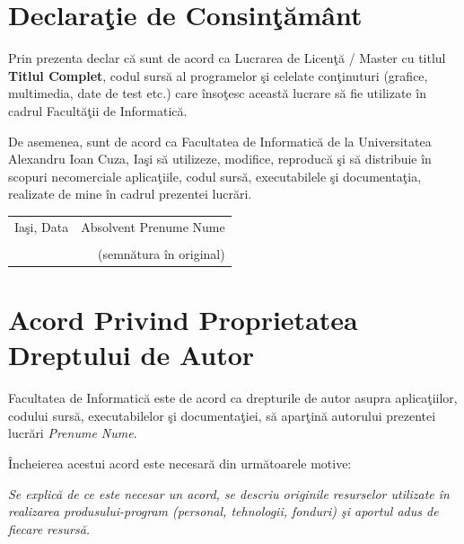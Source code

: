 \newpage
\thispagestyle{empty}

\section*{Declara\c tie de Consin\c t\u am\^ant}

\noindent Prin prezenta declar c\u a sunt de acord ca Lucrarea de Licen\c t\u a / Master cu titlul \textbf{Titlul Complet}, codul surs\u a al programelor \c si celelate con\c tinuturi (grafice, multimedia, date de test etc.) care \^inso\c tesc aceast\u a lucrare s\u a fie utilizate \^in cadrul Facult\u a\c tii de Informatic\u a.

\noindent De asemenea, sunt de acord ca Facultatea de Informatic\u a de la Universitatea Alexandru Ioan Cuza, Ia\c si s\u a utilizeze, modifice, reproduc\u a \c si s\u a distribuie \^in scopuri necomerciale aplica\c tiile, codul surs\u a, executabilele \c si documenta\c tia, realizate de mine \^in cadrul prezentei lucr\u ari.

\vspace{10 mm}

\noindent\begin{tabular}{p{8cm}r}
Ia\c si, Data & Absolvent Prenume Nume\\[8ex]
	 & \makebox[2.5in]{\hrulefill}\\
 & (semn\u atura \^in original)\\%

\end{tabular}


\newpage
\thispagestyle{empty}

\section*{Acord Privind Proprietatea Dreptului de Autor}

\noindent Facultatea de Informatic\u a este de acord ca drepturile de autor asupra aplica\c tiilor, codului surs\u a, executabilelor \c si documenta\c tiei, s\u a apar\c tin\u a autorului prezentei lucr\u ari \textit{Prenume Nume}.

\noindent \^Incheierea acestui acord este necesar\u a din urm\u atoarele motive:

\textit{Se explic\u a de ce este necesar un acord, se descriu originile resurselor utilizate \^in realizarea produsului-program (personal, tehnologii, fonduri) \c si aportul adus de fiecare resurs\u a.}

